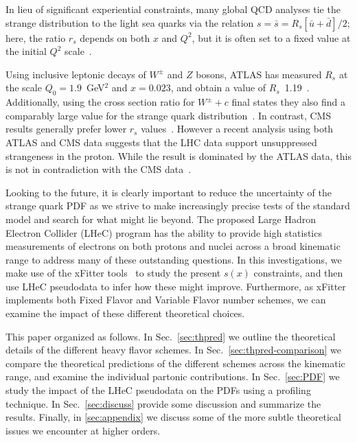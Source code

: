 \documentclass[pdftex,twocolumn,epjc3]{svjour3}          %
\begin{document}
In lieu of  significant experiential constraints,
many global QCD analyses tie the strange distribution 
to the light sea quarks 
via the relation $s= \bar{s}=R_s[\bar{u}+\bar{d}]/2$;
%
here, the ratio $r_s$ depends on both $x$ and $Q^2$, but
it is often set to a fixed value at the initial $Q^2$ scale~\cite{Kretzer:2003it, Martin:2004ir}.

Using inclusive leptonic decays of $W^\pm$ and $Z$ bosons, ATLAS has  measured  $R_s$
at the scale $Q_0 = 1.9$~GeV$^2$ and $x= 0.023$, and obtain a value of $R_s$~1.19~\cite{Aaboud:2016btc}.
%
Additionally, using the cross section ratio for $W^\pm +c$ final states they also find
a comparably large value for the strange quark distribution~\cite{Aad:2014xca}.
%
In contrast, CMS results generally prefer lower $r_s$ values~\cite{Chatrchyan:2013uja}.
However a recent analysis using both ATLAS and CMS data suggests that
the LHC data support unsuppressed strangeness
in the proton. While the result is  dominated by the ATLAS data, this is
not in contradiction with the CMS data~\cite{Cooper-Sarkar:2018ufj}.


Looking to the future, it is clearly important to reduce the uncertainty of the
strange quark PDF as we strive to make increasingly precise tests of the standard model and search
for what might lie beyond.
%
The proposed  Large Hadron Electron Collider (LHeC) program has the ability to provide high statistics measurements
of electrons on both protons and nuclei 
across a broad kinematic range to address many of these outstanding questions.
%
In this investigations, we make use of the
xFitter tools~\cite{Alekhin:2014irh} to study the present $s(x)$ constraints, and then use LHeC
pseudodata to infer how these might improve. Furthermore, as xFitter
implements both Fixed Flavor and Variable Flavor number schemes, we
can examine the impact of these different theoretical choices.


%  
%  

This paper organized as follows.
%
In  Sec.~\ref{sec:thpred} we outline the theoretical details
of the different heavy flavor schemes.
%
In  Sec.~\ref{sec:thpred-comparison} we compare the theoretical predictions
of the different schemes  across
the kinematic range, and examine the individual partonic contributions. 
%
In  Sec.~\ref{sec:PDF} we study the impact of the LHeC pseudodata
on the PDFs using a profiling technique. 
%
In  Sec.~\ref{sec:discuss} provide some discussion and summarize the results. 
%
Finally, in \ref{sec:appendix} we discuss some of the more subtle theoretical
issues we encounter at higher orders. 
\end{document}

